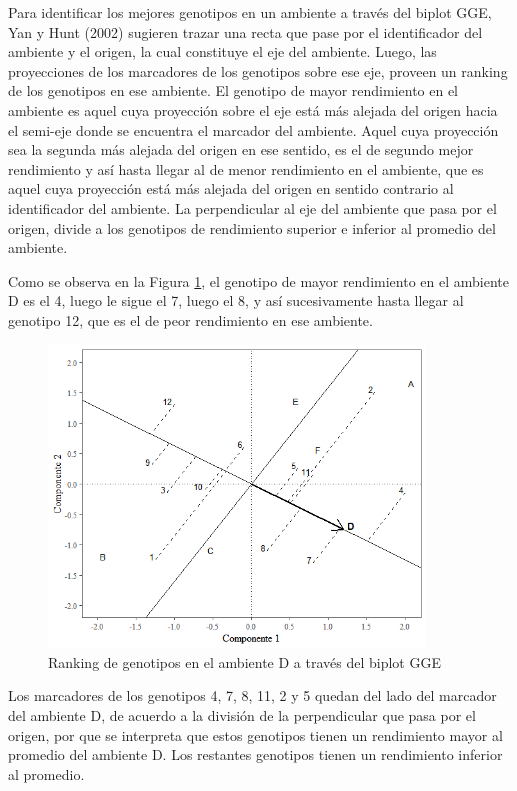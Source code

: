 Para identificar los mejores genotipos en un ambiente a través del biplot GGE, Yan y Hunt (2002) sugieren trazar una recta que pase por el identificador del ambiente y el origen, la cual constituye el eje del ambiente. Luego, las proyecciones de los marcadores de los genotipos sobre ese eje, proveen un ranking de los genotipos en ese ambiente. El genotipo de mayor rendimiento en el ambiente es aquel cuya proyección sobre el eje está más alejada del origen hacia el semi-eje donde se encuentra el marcador del ambiente. Aquel cuya proyección sea la segunda más alejada del origen en ese sentido, es el de segundo mejor rendimiento y así hasta llegar al de menor rendimiento en el ambiente, que es aquel cuya proyección está más alejada del origen en sentido contrario al identificador del ambiente. La perpendicular al eje del ambiente que pasa por el origen, divide a los genotipos de rendimiento superior e inferior al promedio del ambiente.

Como se observa en la Figura \ref{fig:fig312}, el genotipo de mayor rendimiento en el ambiente D es el 4, luego le sigue el 7, luego el 8, y así sucesivamente hasta llegar al genotipo 12, que es el de peor rendimiento en ese ambiente.

\begin{figure}[h]
	\begin{center}
		\includegraphics[width=10cm]{./Graficos/env_GGE.png}
	\end{center}
	\caption{Ranking de genotipos en el ambiente D a través del biplot GGE}
	\label{fig:fig312}
\end{figure}


Los marcadores de los genotipos 4, 7, 8, 11, 2 y 5 quedan del lado del marcador del ambiente D, de acuerdo a la división de la perpendicular que pasa por el origen, por que se interpreta que estos genotipos tienen un rendimiento mayor al promedio del ambiente D. Los restantes genotipos tienen un rendimiento inferior al promedio.


